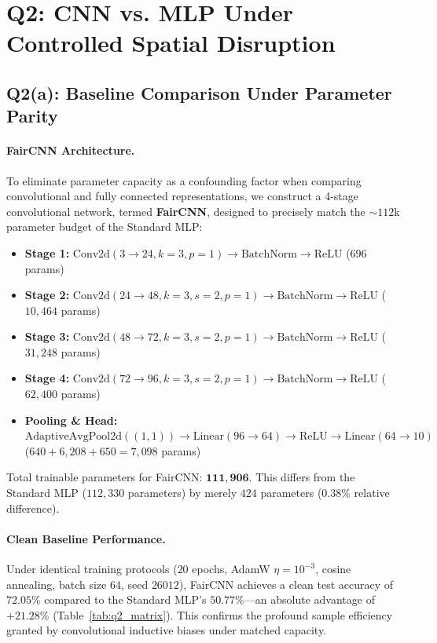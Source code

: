 \section{Q2: CNN vs. MLP Under Controlled Spatial Disruption}
\label{sec:q2}

\subsection{Q2(a): Baseline Comparison Under Parameter Parity}
\paragraph{FairCNN Architecture.}
To eliminate parameter capacity as a confounding factor when comparing convolutional and fully connected representations, we construct a 4-stage convolutional network, termed \textbf{FairCNN}, designed to precisely match the $\sim 112\text{k}$ parameter budget of the Standard MLP:
\begin{itemize}
    \item \textbf{Stage 1:} $\text{Conv2d}(3 \to 24, k=3, p=1) \to \text{BatchNorm} \to \text{ReLU}$ ($696$ params)
    \item \textbf{Stage 2:} $\text{Conv2d}(24 \to 48, k=3, s=2, p=1) \to \text{BatchNorm} \to \text{ReLU}$ ($10{,}464$ params)
    \item \textbf{Stage 3:} $\text{Conv2d}(48 \to 72, k=3, s=2, p=1) \to \text{BatchNorm} \to \text{ReLU}$ ($31{,}248$ params)
    \item \textbf{Stage 4:} $\text{Conv2d}(72 \to 96, k=3, s=2, p=1) \to \text{BatchNorm} \to \text{ReLU}$ ($62{,}400$ params)
    \item \textbf{Pooling \& Head:} $\text{AdaptiveAvgPool2d}((1, 1)) \to \text{Linear}(96 \to 64) \to \text{ReLU} \to \text{Linear}(64 \to 10)$ ($640 + 6{,}208 + 650 = 7{,}098$ params)
\end{itemize}
Total trainable parameters for FairCNN: $\mathbf{111{,}906}$. This differs from the Standard MLP ($112{,}330$ parameters) by merely $424$ parameters ($\mathbf{0.38\%}$ relative difference).

\paragraph{Clean Baseline Performance.}
Under identical training protocols ($20$ epochs, AdamW $\eta=10^{-3}$, cosine annealing, batch size $64$, seed $26012$), FairCNN achieves a clean test accuracy of $\mathbf{72.05\%}$ compared to the Standard MLP's $\mathbf{50.77\%}$—an absolute advantage of $\mathbf{+21.28\%}$ (Table~\ref{tab:q2_matrix}). This confirms the profound sample efficiency granted by convolutional inductive biases under matched capacity.

